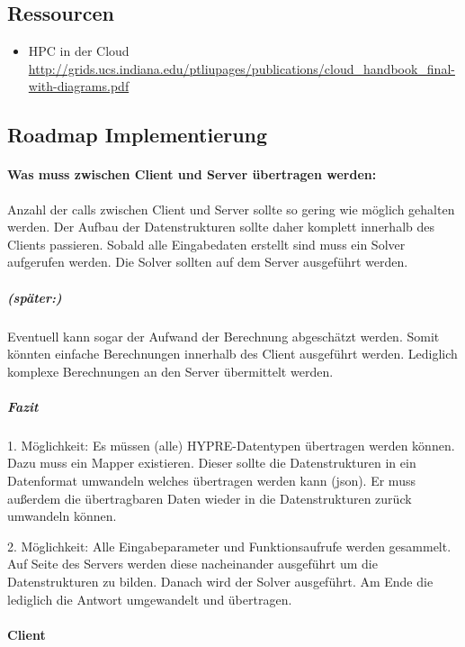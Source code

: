 \documentclass[a4paper,10pt]{article}
\begin{document}
\subsection{Ressourcen}

\begin{itemize}
 \item HPC in der Cloud \url{http://grids.ucs.indiana.edu/ptliupages/publications/cloud_handbook_final-with-diagrams.pdf}
\end{itemize}

\subsection{Roadmap Implementierung}


\paragraph{Was muss zwischen Client und Server übertragen werden:}

Anzahl der calls zwischen Client und Server sollte so gering wie möglich gehalten werden.
Der Aufbau der Datenstrukturen sollte daher komplett innerhalb des Clients passieren.
Sobald alle Eingabedaten erstellt sind muss ein Solver aufgerufen werden.
Die Solver sollten auf dem Server ausgeführt werden.

\subparagraph{(später:)}

Eventuell kann sogar der Aufwand der Berechnung abgeschätzt werden.
Somit könnten einfache Berechnungen innerhalb des Client ausgeführt werden.
Lediglich komplexe Berechnungen an den Server übermittelt werden.

\subparagraph{Fazit}

1. Möglichkeit:
Es müssen (alle) HYPRE-Datentypen übertragen werden können.
Dazu muss ein Mapper existieren.
Dieser sollte die Datenstrukturen in ein Datenformat umwandeln welches übertragen werden kann (json).
Er muss außerdem die übertragbaren Daten wieder in die Datenstrukturen zurück umwandeln können.

2. Möglichkeit:
Alle Eingabeparameter und Funktionsaufrufe werden gesammelt.
Auf Seite des Servers werden diese nacheinander ausgeführt um die Datenstrukturen zu bilden.
Danach wird der Solver ausgeführt.
Am Ende die lediglich die Antwort umgewandelt und übertragen.

\paragraph{Client}
\end{document}
